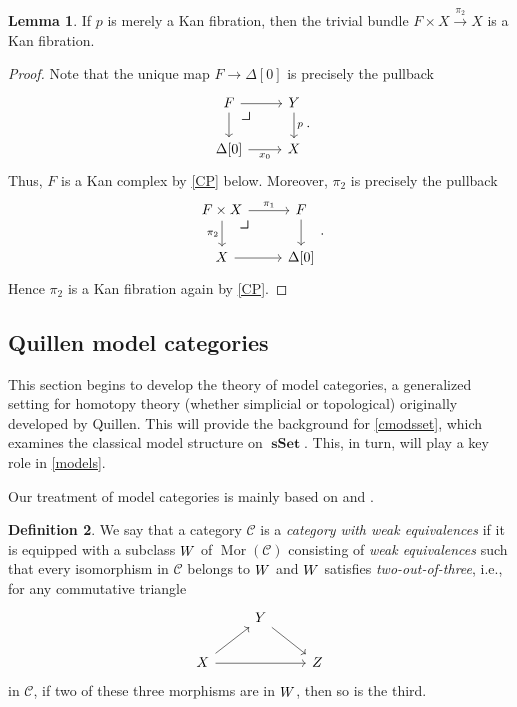 \documentclass[10pt,letterpaper,cm]{nupset}
\theoremstyle{definition}
\newtheorem{definition}{Definition}[subsection]
\theoremstyle{theorem}
\newtheorem{lemma}[definition]{Lemma}
\theoremstyle{remark}
\DeclareMathOperator{\mor}{Mor}
\newcommand{\0}{\mathbf{0}}
\newcommand{\1}{\mathbf{1}}
\newcommand{\2}{\mathbf{2}}
\DeclareMathOperator{\sset}{\mathbf{sSet}}
\renewcommand{\c}{\mathscr{C}}
\DeclareMathOperator{\we}{\mathnormal{W}}
\begin{document}
\begin{lemma}\label{trivbKF}
If $p$ is merely a Kan fibration, then the trivial bundle $F\times X \overset{\pi_2}{\longrightarrow} X$ is a Kan fibration. 
\end{lemma}
\begin{proof}
Note that the unique map $F \to \Delta[0]$ is precisely the pullback
\[
\begin{tikzcd}
F \arrow[r] \arrow[d]         \arrow[dr, phantom, "\scalebox{1.5}{\color{black}$\lrcorner$}" , very near start, color=black]
& 
Y \arrow[d, "p"] \\
{\Delta[0]} \arrow[r, "x_0"'] & X               
\end{tikzcd}
.\] 
Thus, $F$ is a Kan complex by \cref{CP} below. Moreover, $\pi_2$ is precisely the pullback
\[
\begin{tikzcd}
F\times X \arrow[d, "\pi_2"'] \arrow[r, "\pi_1"] 
\arrow[dr, phantom, "\scalebox{1.5}{\color{black}$\lrcorner$}" , very near start, color=black]
& F \arrow[d] \\
X \arrow[r]                                      & {\Delta[0]}
\end{tikzcd}
.\] Hence $\pi_2$ is a Kan fibration again by \cref{CP}. 
\end{proof}

\subsection{Quillen model categories}\label{modcat}

This section begins to develop the theory of model categories, a generalized setting for homotopy theory (whether simplicial or topological) originally developed by Quillen. This will provide the background for \cref{cmodsset}, which examines the classical model structure on $\sset$. This, in turn, will play a key role in  \cref{models}.

\smallskip

Our treatment of model categories is mainly based on \cite{Hirsch} and \cite{Hovey}.

\bigskip

\begin{definition}\label{WE}
We say that a category $\c$ is a \textit{category with weak equivalences} if it is equipped with a subclass $\we$ of $\mor(\c)$ consisting of \textit{weak equivalences} such that every isomorphism in $\c$ belongs to $\we$ and $\we$ satisfies \textit{two-out-of-three}, i.e., for any commutative triangle
\[
\begin{tikzcd}
                        & Y \arrow[rd] &   \\
X \arrow[ru] \arrow[rr] &              & Z
\end{tikzcd}
\] in $\c$, if two of these three morphisms are in $\we$, then so is the third.
\end{definition}
\end{document}
